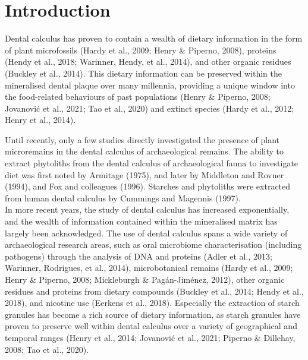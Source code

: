 \documentclass[
]{article}
\begin{document}
\hypertarget{introduction}{%
\section{Introduction}\label{introduction}}

Dental calculus has proven to contain a wealth of
dietary information in the form of plant microfossils
(Hardy et al., 2009; Henry \& Piperno, 2008),
proteins (Hendy et al., 2018; Warinner, Hendy, et al., 2014),
and other organic residues (Buckley et al., 2014).
This dietary information can be preserved within the mineralised dental plaque
over many millennia, providing a unique window into the food-related behaviours of
past populations
(Henry \& Piperno, 2008; Jovanović et al., 2021; Tao et al., 2020)
and extinct species (Hardy et al., 2012; Henry et al., 2014).

Until recently, only a few studies directly investigated the presence of plant
microremains
in the dental calculus of archaeological remains. The ability to extract phytoliths
from the dental calculus of archaeological fauna to investigate diet was first
noted by Armitage (1975),
and later by Middleton and Rovner (1994),
and Fox and colleagues (1996). Starches and phytoliths were
extracted from human dental calculus by Cummings and Magennis (1997).\\
In more recent years, the study of dental calculus has increased exponentially,
and the wealth of information contained within the mineralised matrix has largely
been acknowledged. The use of dental calculus spans a wide
variety of archaeological research areas, such as oral microbiome
characterisation (including pathogens) through the analysis of DNA and proteins
(Adler et al., 2013; Warinner, Rodrigues, et al., 2014),
microbotanical remains (Hardy et al., 2009; Henry \& Piperno, 2008; Mickleburgh \& Pagán-Jiménez, 2012),
other organic residues and proteins from dietary compounds
(Buckley et al., 2014; Hendy et al., 2018),
and nicotine use (Eerkens et al., 2018). Especially the extraction
of starch granules has become a rich source of dietary
information, as starch granules have proven to preserve well within dental calculus
over a variety of geographical and temporal ranges
(Henry et al., 2014; Jovanović et al., 2021; Piperno \& Dillehay, 2008; Tao et al., 2020).
\end{document}
